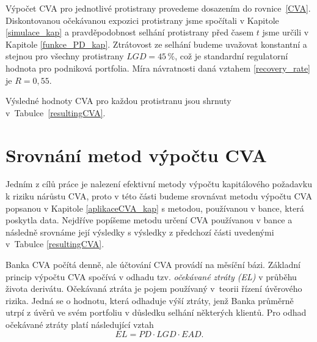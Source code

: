 \documentclass[a4paper,12pt]{report}
\theoremstyle{definition} \newtheorem{definice}[veta]{Definice}
\theoremstyle{remark}
\begin{document}
Výpočet CVA pro jednotlivé protistrany provedeme dosazením do rovnice~\eqref{CVA}. 
Diskontovanou očekávanou expozici protistrany jsme spočítali v Kapitole \ref{simulace_kap} a pravděpodobnost selhání protistrany před časem $t$ jsme určili v Kapitole \ref{funkce_PD_kap}.
Ztrátovost ze selhání budeme uvažovat konstantní a stejnou pro všechny protistrany $LGD=45\,\%$, což je standardní regulatorní hodnota pro podniková portfolia. 
Míra návratnosti daná vztahem \eqref{recovery_rate} je $R=0,55$.

Výsledné hodnoty CVA pro každou protistranu jsou shrnuty v~Tabulce~\ref{resultingCVA}.
\begin{table}%
  \centering 
\caption{Přehled výsledků CVA pro jednotlivé protistrany}
\label{resultingCVA}
\vspace{5mm}
\end{table}



\section{Srovnání metod výpočtu CVA}\label{srovnani_metod_cva}
Jedním z cílů práce je nalezení efektivní metody výpočtu kapitálového požadavku k riziku nárůstu CVA, proto v této části budeme srovnávat metodu výpočtu CVA popsanou v Kapitole \ref{aplikaceCVA_kap} s metodou, používanou v bance, která poskytla data.
Nejdříve popíšeme metodu určení CVA používanou v bance a následně srovnáme její výsledky s výsledky z předchozí části uvedenými v~Tabulce \ref{resultingCVA}. 

Banka CVA počítá denně, ale účtování CVA provádí na měsíční bázi.
Základní princip výpočtu CVA spočívá v odhadu tzv. \textit{očekávané ztráty (EL)} v průběhu života derivátu. 
Očekávaná ztráta je pojem používaný v~teorii řízení úvěrového rizika.
Jedná se o hodnotu, která odhaduje výší ztráty, jenž Banka průměrně utrpí z úvěrů ve svém portfoliu v důsledku selhání některých klientů. 
Pro odhad očekávané ztráty platí následující vztah 
\begin{equation}\label{el}
EL=PD\cdot LGD\cdot EAD.
\end{equation}
\end{document}
